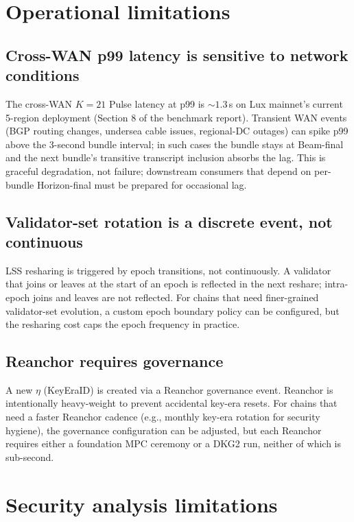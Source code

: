\documentclass[11pt]{article}
\begin{document}
\section{Operational limitations}

\subsection{Cross-WAN p99 latency is sensitive to network conditions}

The cross-WAN $K = 21$ Pulse latency at p99 is $\sim 1.3$\,s on Lux mainnet's
current 5-region deployment (Section 8 of the benchmark report). Transient
WAN events (BGP routing changes, undersea cable issues, regional-DC outages)
can spike p99 above the 3-second bundle interval; in such cases the bundle
stays at Beam-final and the next bundle's transitive transcript inclusion
absorbs the lag. This is graceful degradation, not failure; downstream
consumers that depend on per-bundle Horizon-final must be prepared for
occasional lag.

\subsection{Validator-set rotation is a discrete event, not continuous}

LSS resharing is triggered by epoch transitions, not continuously. A
validator that joins or leaves at the start of an epoch is reflected in the
next reshare; intra-epoch joins and leaves are not reflected. For chains that
need finer-grained validator-set evolution, a custom epoch boundary policy
can be configured, but the resharing cost caps the epoch frequency in
practice.

\subsection{Reanchor requires governance}

A new $\eta$ (KeyEraID) is created via a Reanchor governance event. Reanchor
is intentionally heavy-weight to prevent accidental key-era resets. For
chains that need a faster Reanchor cadence (e.g., monthly key-era rotation
for security hygiene), the governance configuration can be adjusted, but
each Reanchor requires either a foundation MPC ceremony or a DKG2 run,
neither of which is sub-second.

\section{Security analysis limitations}
\end{document}
